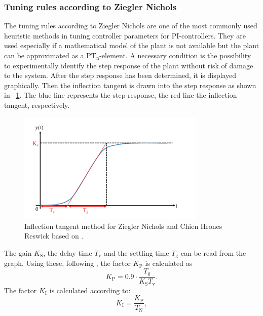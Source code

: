 \subsubsection{Tuning rules according to Ziegler Nichols} \label{chap:ZN}
The tuning rules according to Ziegler Nichols are one of the most commonly used heuristic methods in tuning controller parameters for PI-controllers. They are used especially if a mathematical model of the plant is not available but the plant can be approximated as a PT$_{\mathrm{n}}$-element. \cite{Reg_17}
A necessary condition is the possibility to experimentally identify the step response of the plant without risk of damage to the system. After the step response has been determined, it is displayed graphically. Then the inflection tangent is drawn into the step response as shown in \figurename~\ref{fig:param_zn}. The blue line represents the step response, the red line the inflection tangent, respectively.
\begin{figure}
   \centering
   \includegraphics[width=0.8\textwidth]{images/chapt_3/param_zn.pdf}
   \caption[Inflection tangent method for Ziegler Nichols and Chien Hrones Reswick]{Inflection tangent method for Ziegler Nichols and Chien Hrones Reswick based on \cite{Reg_17}.}
   \label{fig:param_zn}
 \end{figure}
The gain $K_{\mathrm{S}}$, the delay time $T_{\mathrm{v}}$ and the settling time $T_{\mathrm{g}}$ can be read from the graph.
Using these, following \cite{Reg_17}, the factor $K_{\mathrm{P}}$ is calculated as
\begin{equation}
  K_{\mathrm{P}} = 0.9\cdot\frac{T_{\mathrm{g}}}{K_{\mathrm{S}}T_{\mathrm{v}}}.
  \label{eq:kp_zn}
\end{equation}
The factor $K_{\mathrm{I}}$ is calculated according to:
\begin{equation}
    K_{\mathrm{I}}  = \frac{K_{\mathrm{P}}}{T_{\mathrm{N}}},
 \label{eq:K_I}
\end{equation}

